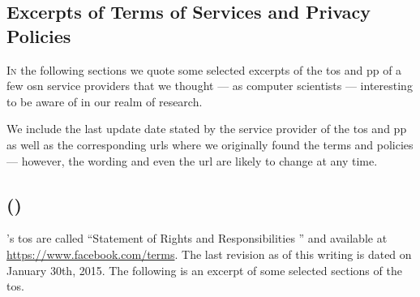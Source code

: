 \documentclass[showtrims, oldfontcommands]{kthesis}
\makeatletter
\newcommand*{\greek}[1]{%
   \expandafter\@greek\csname c@#1\endcsname
}
\newcommand*{\@greek}[1]{%
   $\ifcase#1\or\alpha\or\beta\or\gamma\or\delta\or\varepsilon
     \or\zeta\or\eta\or\theta\or\iota\or\kappa\or\lambda
     \or\mu\or\nu\or\xi\or o\or\pi\or\varrho\or\sigma
     \or\tau\or\upsilon\or\phi\or\chi\or\psi\or\omega
     \else\@ctrerr\fi$%
}
\makeatother
\begin{document}
\newenvironment{quote_tos}{%
    \definecolor{formalshade}{rgb}{0.95,0.95,1}
    \setlength{\parindent}{0pt}
    \def\FrameCommand{%
        \hspace{1pt}%
        {\color{DarkBlue}\vrule width 2pt}%
        {\color{formalshade}\vrule width 4pt}%
        \colorbox{formalshade}%
    }%
    \MakeFramed{\advance\hsize-\width\FrameRestore}%
    \noindent\hspace{-4.55pt}%
    \begin{adjustwidth}{}{7pt}%
        \vspace{2pt}\vspace{2pt}%
}
{%
    \vspace{2pt}\end{adjustwidth}\endMakeFramed%
}

\begin{appendices}
    \addappheadtotoc
    \renewcommand\thechapter{\greek{chapter}}
    \renewcommand\thesection{\thechapter.\greek{section}}

    \chapter{Excerpts of Terms of Services and Privacy Policies}
        \label{chapter:excerpts-of-tos-and-pp}
    
    \lettrine{\textcolor[gray]{.25}{I}}{n} the following sections we quote some 
    selected excerpts of the \ac{tos} and \ac{pp} of a few \ac{osn} service providers 
    that we thought --- as computer scientists --- interesting to be aware of in 
    our realm of research.
    
    We include the last update date stated by the service provider of the \ac{tos} 
    and \ac{pp} as well as the corresponding \acp{url} where we originally found 
    the terms and policies --- however, the wording and even the \ac{url} are likely 
    to change at any time.

    \section[\Facebook]{\Facebook (\FacebookInc)}
        \label{section:excerpts-facebook}
    \Facebook's \acs{tos} are called ``Statement of Rights and Responsibilities
    '' and available at \url{https://www.facebook.com/terms}. The last revision as of 
    this writing is dated on January 30th, 2015. The following is an excerpt of some 
    selected sections of the \ac{tos}.


\end{appendices}
\end{document}
